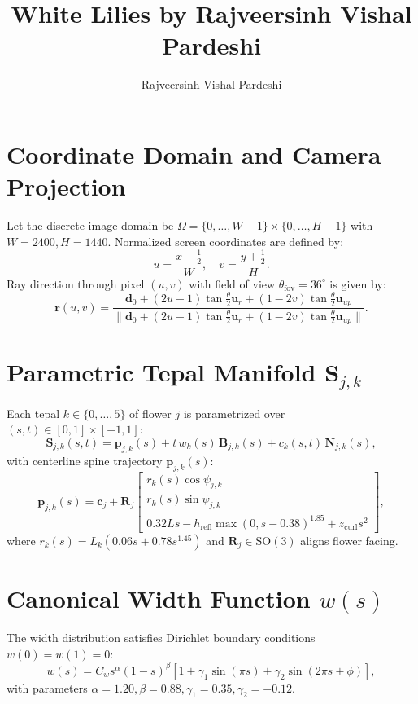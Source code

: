 \documentclass[10pt,twocolumn]{article}
\title{\textbf{White Lilies by Rajveersinh Vishal Pardeshi}}
\author{Rajveersinh Vishal Pardeshi}
\date{}
\begin{document}
\maketitle

\section{Coordinate Domain and Camera Projection}
Let the discrete image domain be $\Omega = \{0, \dots, W-1\} \times \{0, \dots, H-1\}$ with $W=2400, H=1440$.
Normalized screen coordinates are defined by:
\begin{equation}
u = \frac{x + \frac{1}{2}}{W}, \quad v = \frac{y + \frac{1}{2}}{H}.
\end{equation}
Ray direction through pixel $(u, v)$ with field of view $\theta_{\mathrm{fov}} = 36^\circ$ is given by:
\begin{equation}
\mathbf{r}(u, v) = \frac{\mathbf{d}_0 + (2u - 1)\tan\frac{\theta}{2}\mathbf{u}_r + (1 - 2v)\tan\frac{\theta}{2}\mathbf{u}_{up}}{\|\mathbf{d}_0 + (2u - 1)\tan\frac{\theta}{2}\mathbf{u}_r + (1 - 2v)\tan\frac{\theta}{2}\mathbf{u}_{up}\|}.
\end{equation}

\section{Parametric Tepal Manifold $\mathbf{S}_{j,k}$}
Each tepal $k \in \{0, \dots, 5\}$ of flower $j$ is parametrized over $(s, t) \in [0, 1] \times [-1, 1]$:
\begin{equation}
\mathbf{S}_{j,k}(s, t) = \mathbf{p}_{j,k}(s) + t\,w_k(s)\,\mathbf{B}_{j,k}(s) + c_k(s, t)\,\mathbf{N}_{j,k}(s),
\end{equation}
with centerline spine trajectory $\mathbf{p}_{j,k}(s)$:
\begin{equation}
\mathbf{p}_{j,k}(s) = \mathbf{c}_j + \mathbf{R}_j \begin{bmatrix}
r_k(s) \cos\psi_{j,k} \\
r_k(s) \sin\psi_{j,k} \\
0.32 L s - h_{\mathrm{refl}}\max(0, s - 0.38)^{1.85} + z_{\mathrm{curl}} s^2
\end{bmatrix},
\end{equation}
where $r_k(s) = L_k (0.06 s + 0.78 s^{1.45})$ and $\mathbf{R}_j \in \mathrm{SO}(3)$ aligns flower facing.

\section{Canonical Width Function $w(s)$}
The width distribution satisfies Dirichlet boundary conditions $w(0) = w(1) = 0$:
\begin{equation}
w(s) = C_w s^\alpha (1 - s)^\beta \left[ 1 + \gamma_1 \sin(\pi s) + \gamma_2 \sin(2\pi s + \phi) \right],
\end{equation}
with parameters $\alpha = 1.20, \beta = 0.88, \gamma_1 = 0.35, \gamma_2 = -0.12$.
\end{document}

